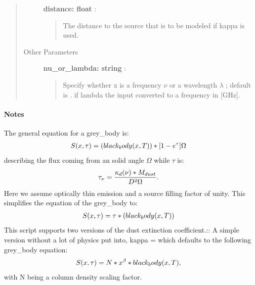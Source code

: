 \documentclass[a4paper,10pt,english]{sphinxmanual}
\begin{document}
\begin{fulllineitems}
\begin{quote}
\begin{description}
\textbf{distance: float} :
\begin{quote}

The distance to the source that is to be modeled if kappa
 is used.
\end{quote}

\item[{Other Parameters}] \leavevmode
\textbf{nu\_or\_lambda: string} :
\begin{quote}

Specify whether x is a frequency $\nu$  or a wavelength
$\lambda$ ; default is . if lambda the input
converted to a frequency in {[}GHz{]}.
\end{quote}

\end{description}\end{quote}
\paragraph{Notes}

The general equation for a grey\_body is:
\begin{gather}
\begin{split}S(x, \tau) = (black_body(x, T)) * [1 - e^\tau] \Omega\end{split}\notag
\end{gather}
describing the flux coming from an solid angle
$\Omega$ while $\tau$ is:
\begin{gather}
\begin{split}\tau_{\nu} = \frac{ \kappa_d(\nu) * M_{dust}}{D^2 \Omega} .\end{split}\notag
\end{gather}
Here we assume optically thin emission and a source filling factor of
unity. This simplifies the equation of the grey\_body to:
\begin{gather}
\begin{split}S(x, \tau) = \tau * (black_body(x, T))\end{split}\notag
\end{gather}
This script supports two versions of the dust extinction coefficient.::
A simple version without a lot of physics put into, kappa = 
which defaults to the following grey\_body equation:
\begin{gather}
\begin{split}S(x, \tau) = N * x^{\beta} * black_body(x,T) ,\end{split}\notag
\end{gather}
with N being a column density scaling factor.


\end{fulllineitems}
\end{document}
